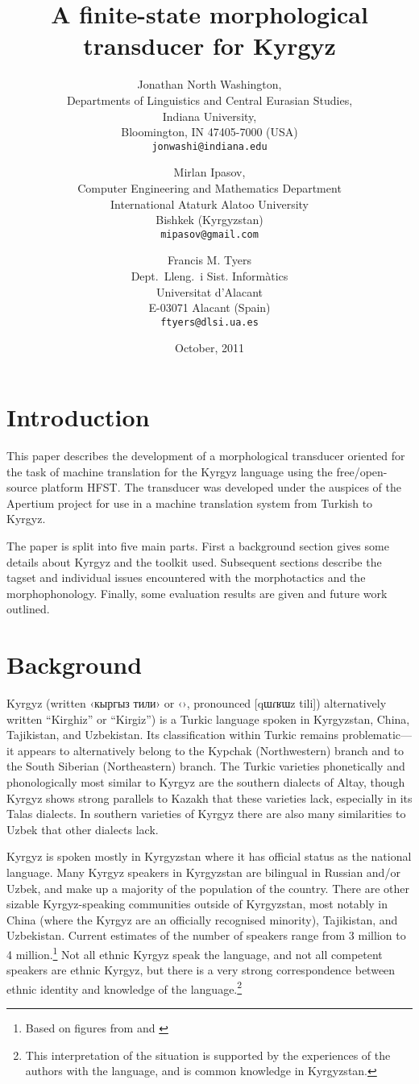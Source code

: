 \documentclass[a4paper,12pt,onecolumn,oneside]{article}
\title{A finite-state morphological transducer for Kyrgyz}
\author {Jonathan North Washington, \\
Departments of Linguistics and Central Eurasian Studies,\\
Indiana University,\\
Bloomington, IN 47405-7000 (USA)\\
\texttt{jonwashi@indiana.edu} \and 
Mirlan Ipasov,\\
Computer Engineering and Mathematics Department\\
International Ataturk Alatoo University\\
Bishkek (Kyrgyzstan)\\
\texttt{mipasov@gmail.com} \and
Francis M. Tyers\\
Dept.\ Lleng.\ i Sist. Informàtics \\  
Universitat d'Alacant\\
E-03071 Alacant (Spain)\\
\texttt{ftyers@dlsi.ua.es} 
 }
\date{October, 2011}
\begin{document}
\maketitle{}
\thispagestyle{empty}

\section{Introduction}
This paper describes the development of a morphological transducer oriented for the task of machine translation for the Kyrgyz language using the free/open-source platform HFST. The transducer was developed under the auspices of the Apertium \citet{forcada2011} project for use in a machine translation system from Turkish to Kyrgyz.

The paper is split into five main parts. First a background section gives some details about Kyrgyz and the toolkit used. Subsequent sections describe the tagset and individual issues encountered with the morphotactics and the morphophonology. Finally, some evaluation results are given and future work outlined.

\section{Background}
Kyrgyz (written ‹кыргыз тили› or ‹›, pronounced [qɯɾʁɯz tili]) alternatively written ``Kirghiz'' or ``Kirgiz'') is a Turkic language spoken in Kyrgyzstan, China, Tajikistan, and Uzbekistan.  Its classification within Turkic remains problematic—it appears to alternatively belong to the Kypchak (Northwestern) branch and to the South Siberian (Northeastern) branch.  The Turkic varieties phonetically and phonologically most similar to Kyrgyz are the southern dialects of Altay, though Kyrgyz shows strong parallels to Kazakh that these varieties lack, especially in its Talas dialects.  In southern varieties of Kyrgyz there are also many similarities to Uzbek that other dialects lack.

Kyrgyz is spoken mostly in Kyrgyzstan where it has official status as the national language.  Many Kyrgyz speakers in Kyrgyzstan are bilingual in Russian and/or Uzbek, and make up a majority of the population of the country.  There are other sizable Kyrgyz-speaking communities outside of Kyrgyzstan, most notably in China (where the Kyrgyz are an officially recognised minority), Tajikistan, and Uzbekistan.  Current estimates of the number of speakers range from 3 million to 4 million.\footnote{Based on figures from \citet{lewis2009} and \citet{factbook2009}}  Not all ethnic Kyrgyz speak the language, and not all competent speakers are ethnic Kyrgyz, but there is a very strong correspondence between ethnic identity and knowledge of the language.\footnote{This interpretation of the situation is supported by the experiences of the authors with the language, and is common knowledge in Kyrgyzstan.}
\end{document}
